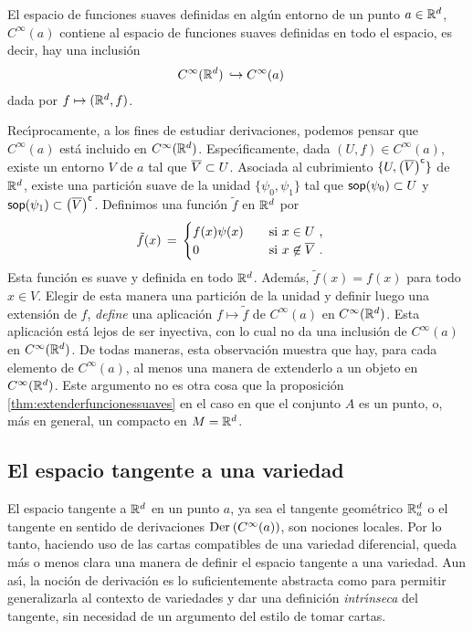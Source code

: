 \begin{obsDerivacionesLocalGlobal}\label{obs:derivacioneslocalglobal}
	El espacio de funciones suaves definidas en alg\'{u}n entorno de
	un punto $a\in\mathbb{R}^{d}$, $C^{\infty}(a)$ contiene al espacio de
	funciones suaves definidas en todo el espacio, es decir,
	hay una inclusi\'{o}n
	\begin{align*}
		C^{\infty}(\mathbb{R}^{d}) & \,\hookrightarrow C^{\infty}(a)
	\end{align*}
	dada por $f\mapsto (\mathbb{R}^{d},f)$.

	Rec\'{\i}procamente, a los fines de estudiar derivaciones, podemos
	pensar que $C^{\infty}(a)$ est\'{a} incluido en
	$C^{\infty}(\mathbb{R}^{d})$. Espec\'{\i}ficamente, dada
	$(U,f)\in C^{\infty}(a)$, existe un entorno $V$ de $a$ tal que
	$\overline{V}\subset U$. Asociada al cubrimiento
	$\{U,\left(\overline{V}\right)^{\mathsf{c}}\}$ de $\mathbb{R}^{d}$, existe una partici\'{o}n
	suave de la unidad $\{\psi_{0},\psi_{1}\}$ tal que
	$\mathsf{sop}(\psi_{0})\subset U$ y $\soporte{\psi_{1}}\subset%
	\setcomp{\clos{V}}$. Definimos una funci\'{o}n $\tilde{f}$ en
	$\mathbb{R}^{d}$ por
	\begin{align*}
		\tilde{f}(x) & \,=\,
			\begin{cases}
				f(x)\psi(x) & \quad\text{si }x\in U\text{ ,}\\
				0 & \quad\text{si }x\not\in\overline{V}\text{ .}
			\end{cases}
	\end{align*}
	Esta funci\'{o}n es suave y definida en todo $\mathbb{R}^{d}$. Adem\'{a}s,
	$\tilde{f}(x)=f(x)$ para todo $x\in V$. Elegir de esta manera una
	partici\'{o}n de la unidad y definir luego una extensi\'{o}n de $f$,
	\emph{define} una aplicaci\'{o}n $f\mapsto\tilde{f}$ de
	$C^{\infty}(a)$ en $C^{\infty}(\mathbb{R}^{d})$. Esta aplicaci\'{o}n
	est\'{a} lejos de ser inyectiva, con lo cual no da una
	inclusi\'{o}n de $C^{\infty}(a)$ en $C^{\infty}(\mathbb{R}^{d})$. De todas
	maneras, esta observaci\'{o}n muestra que hay, para cada elemento
	de $C^{\infty}(a)$, al menos una manera de extenderlo a un objeto en
	$C^{\infty}(\mathbb{R}^{d})$. Este argumento no es otra cosa que
	la proposici\'{o}n \ref{thm:extenderfuncionessuaves} en el caso en
	que el conjunto $A$ es un punto, o, m\'{a}s en general, un compacto
	en $M=\mathbb{R}^{d}$.
\end{obsDerivacionesLocalGlobal}

\subsection{El espacio tangente a una variedad}
El espacio tangente a $\mathbb{R}^{d}$ en un punto $a$, ya sea el tangente
geom\'{e}trico $\mathbb{R}^{d}_{a}$ o el tangente en sentido de derivaciones
$\mathrm{Der}_{}\left(C^{\infty}(a)\right)$, son nociones locales. Por lo tanto, haciendo
uso de las cartas compatibles de una variedad diferencial, queda m\'{a}s o
menos clara una manera de definir el espacio tangente a una variedad.
Aun as\'{\i}, la noci\'{o}n de derivaci\'{o}n es lo suficientemente abstracta
como para permitir generalizarla al contexto de variedades y dar una
definici\'{o}n \emph{intr\'{\i}nseca} del tangente, sin necesidad de un
argumento del estilo de tomar cartas.

